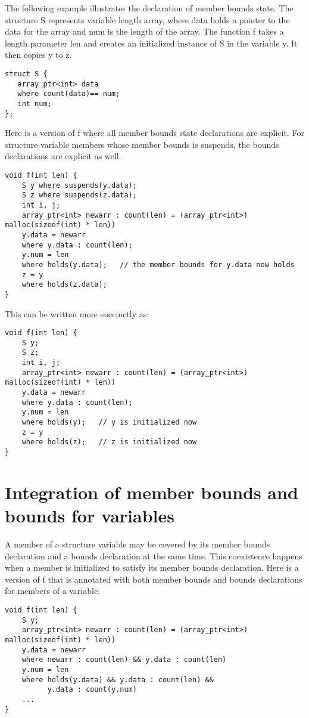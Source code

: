 The following example illustrates the declaration of member bounds
state. The structure S represents variable length array, where data
holds a pointer to the data for the array and num is the length of the
array. The function f takes a length parameter len and creates an
initialized instance of S in the variable y. It then copies y to z.

\begin{verbatim}
struct S {
   array_ptr<int> data
   where count(data)== num;
   int num;
};
\end{verbatim}

Here is a version of f where all member bounds state declarations are
explicit. For structure variable members whose member bounds is
suspends, the bounds declarations are explicit as well.

\begin{verbatim}
void f(int len) {
    S y where suspends(y.data);
    S z where suspends(z.data);
    int i, j;
    array_ptr<int> newarr : count(len) = (array_ptr<int>) malloc(sizeof(int) * len))
    y.data = newarr
    where y.data : count(len);
    y.num = len
    where holds(y.data);   // the member bounds for y.data now holds
    z = y
    where holds(z.data);
}
\end{verbatim}

This can be written more succinctly as:

\begin{verbatim}
void f(int len) {
    S y;
    S z;
    int i, j;
    array_ptr<int> newarr : count(len) = (array_ptr<int>) malloc(sizeof(int) * len))
    y.data = newarr
    where y.data : count(len);
    y.num = len
    where holds(y);   // y is initialized now
    z = y
    where holds(z);   // z is initialized now
}
\end{verbatim}

\section{Integration of member bounds and bounds for variables}\label{integration-of-member-bounds-and-bounds-for-variables}

A member of a structure variable may be covered by its member bounds
declaration and a bounds declaration at the same time. This coexistence
happens when a member is initialized to satisfy its member bounds
declaration. Here is a version of f that is annotated with both member
bounds and bounds declarations for members of a variable.
\begin{verbatim}
void f(int len) {
    S y;
    array_ptr<int> newarr : count(len) = (array_ptr<int>) malloc(sizeof(int) * len))
    y.data = newarr
    where newarr : count(len) && y.data : count(len)
    y.num = len
    where holds(y.data) && y.data : count(len) && 
          y.data : count(y.num)
    ...
}
\end{verbatim}

